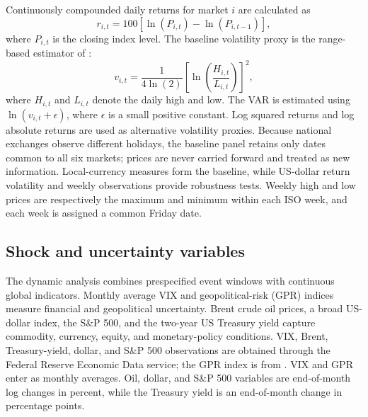 \documentclass[12pt,a4paper]{article}
\begin{document}
Continuously compounded daily returns for market $i$ are calculated as
\begin{equation}
 r_{i,t}=100\left[\ln(P_{i,t})-\ln(P_{i,t-1})\right],
 \label{eq:return}
\end{equation}
where $P_{i,t}$ is the closing index level. The baseline volatility proxy is the range-based estimator of \citet{Parkinson1980}:
\begin{equation}
 v_{i,t}=\frac{1}{4\ln(2)}\left[\ln\left(\frac{H_{i,t}}{L_{i,t}}\right)\right]^2,
 \label{eq:parkinson}
\end{equation}
where $H_{i,t}$ and $L_{i,t}$ denote the daily high and low. The VAR is estimated using $\ln(v_{i,t}+\epsilon)$, where $\epsilon$ is a small positive constant. Log squared returns and log absolute returns are used as alternative volatility proxies. Because national exchanges observe different holidays, the baseline panel retains only dates common to all six markets; prices are never carried forward and treated as new information. Local-currency measures form the baseline, while US-dollar return volatility and weekly observations provide robustness tests. Weekly high and low prices are respectively the maximum and minimum within each ISO week, and each week is assigned a common Friday date.

\subsection{Shock and uncertainty variables}

The dynamic analysis combines prespecified event windows with continuous global indicators. Monthly average VIX and geopolitical-risk (GPR) indices measure financial and geopolitical uncertainty. Brent crude oil prices, a broad US-dollar index, the S\&P 500, and the two-year US Treasury yield capture commodity, currency, equity, and monetary-policy conditions. VIX, Brent, Treasury-yield, dollar, and S\&P 500 observations are obtained through the Federal Reserve Economic Data service; the GPR index is from \citet{CaldaraIacoviello2022}. VIX and GPR enter as monthly averages. Oil, dollar, and S\&P 500 variables are end-of-month log changes in percent, while the Treasury yield is an end-of-month change in percentage points.
\end{document}
